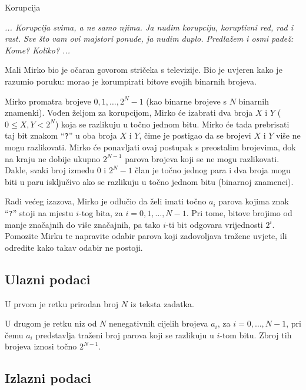 \begin{statement}[
  problempoints=100,
  timelimit=1 sekunda,
  memorylimit= 512 MiB,
]{Korupcija}

\textit{... Korupcija svima, a ne samo njima. Ja nudim korupciju, koruptivni red, rad i rast. 
Sve što vam ovi majstori ponude, ja nudim duplo. 
Predlažem i osmi padež: Kome? Koliko? ...}

Mali Mirko bio je očaran govorom stričeka s televizije. 
Bio je uvjeren kako je razumio poruku: morao je korumpirati bitove svojih binarnih brojeva. 

Mirko promatra brojeve $0, 1, \dots, 2^N-1$ (kao binarne brojeve s $N$ binarnih znamenki). 
Vođen željom za korupcijom, Mirko će izabrati dva broja $X$ i $Y$ ($0 \leq X, Y < 2^N$) 
koja se razlikuju u točno jednom bitu. Mirko će tada prebrisati 
taj bit znakom “\texttt{?}” u oba broja $X$ i $Y$, 
čime je postigao da se brojevi $X$ i $Y$ više ne mogu razlikovati. 
Mirko će ponavljati ovaj postupak s preostalim brojevima, dok na kraju ne dobije 
ukupno $2^{N-1}$ parova brojeva koji se ne mogu razlikovati. 
Dakle, svaki broj između $0$ i $2^N - 1$ član je točno jednog para i 
dva broja mogu biti u paru isključivo ako se razlikuju u točno jednom bitu (binarnoj znamenci). 

Radi većeg izazova, Mirko je odlučio da želi imati točno $a_i$ parova 
kojima znak “\texttt{?}” stoji na mjestu $i$-tog bita, za $i = 0, 1, \dots, N-1$. 
Pri tome, bitove brojimo od manje značajnih do više značajnih, pa tako $i$-ti bit 
odgovara vrijednosti $2^i$. 
Pomozite Mirku te napravite odabir parova koji zadovoljava tražene uvjete, ili 
odredite kako takav odabir ne postoji. 

\subsection*{Ulazni podaci}

U prvom je retku prirodan broj $N$ iz teksta zadatka. 

U drugom je retku niz od $N$ nenegativnih cijelih brojeva $a_i$, za $i = 0, \dots, N-1$, 
pri čemu $a_i$ predstavlja traženi broj parova koji se razlikuju u $i$-tom bitu. 
Zbroj tih brojeva iznosi točno $2^{N-1}$. 

\subsection*{Izlazni podaci}


\end{statement}
